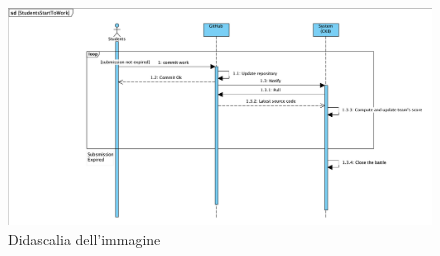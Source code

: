     \begin{figure}[H]
  \includegraphics[width=1\linewidth]{SequenceDiagram/StudentsStartWorking.png} 
  \caption{Didascalia dell'immagine}
  \label{fig:immagine}
\end{figure}

